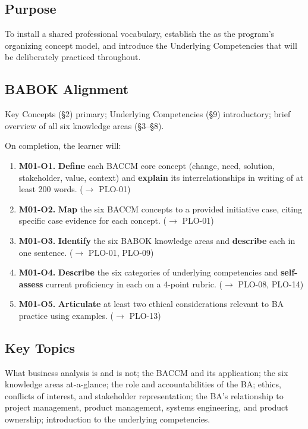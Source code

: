 \documentclass[11pt,letterpaper,oneside]{report}
\begin{document}
\subsection*{Purpose}
To install a shared professional vocabulary, establish the  as the program's organizing concept model, and introduce the Underlying Competencies that will be deliberately practiced throughout.

\subsection*{BABOK Alignment}
Key Concepts (\S2) primary; Underlying Competencies (\S9) introductory; brief overview of all six knowledge areas (\S3--\S8).

\begin{outcomes}
On completion, the learner will:
\begin{enumerate}
  \item \textbf{M01-O1.} \textbf{Define} each BACCM core concept (change, need, solution, stakeholder, value, context) and \textbf{explain} its interrelationships in writing of at least 200 words. ($\to$ PLO-01)
  \item \textbf{M01-O2.} \textbf{Map} the six BACCM concepts to a provided initiative case, citing specific case evidence for each concept. ($\to$ PLO-01)
  \item \textbf{M01-O3.} \textbf{Identify} the six BABOK knowledge areas and \textbf{describe} each in one sentence. ($\to$ PLO-01, PLO-09)
  \item \textbf{M01-O4.} \textbf{Describe} the six categories of underlying competencies and \textbf{self-assess} current proficiency in each on a 4-point rubric. ($\to$ PLO-08, PLO-14)
  \item \textbf{M01-O5.} \textbf{Articulate} at least two ethical considerations relevant to BA practice using examples. ($\to$ PLO-13)
\end{enumerate}
\end{outcomes}

\subsection*{Key Topics}
What business analysis is and is not; the BACCM and its application; the six knowledge areas at-a-glance; the role and accountabilities of the BA; ethics, conflicts of interest, and stakeholder representation; the BA's relationship to project management, product management, systems engineering, and product ownership; introduction to the underlying competencies.
\end{document}
